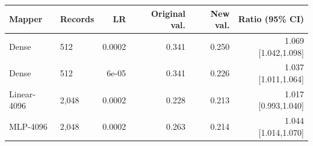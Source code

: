 \begin{tabular}{llrrrr}
\toprule
Mapper & Records & LR & Original val. & New val. & Ratio (95\% CI) \\
\midrule
Dense & 512 & 0.0002 & 0.341 & 0.250 & 1.069 [1.042,1.098]\\
Dense & 512 & 6e-05 & 0.341 & 0.226 & 1.037 [1.011,1.064]\\
Linear-4096 & 2,048 & 0.0002 & 0.228 & 0.213 & 1.017 [0.993,1.040]\\
MLP-4096 & 2,048 & 0.0002 & 0.263 & 0.214 & 1.044 [1.014,1.070]\\
\bottomrule
\end{tabular}
